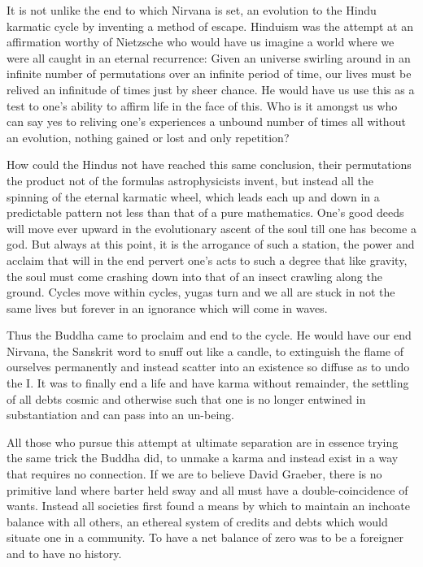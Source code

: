 \documentclass[ebook, 10pt, openright, onecolumn]{memoir}
\begin{document}
It is not unlike the end to which Nirvana is set, an evolution to the Hindu
karmatic cycle by inventing a method of escape.  Hinduism was the attempt at an
affirmation worthy of Nietzsche who would have us imagine a world where we were
all caught in an eternal recurrence: Given an universe swirling around in an
infinite number of permutations over an infinite period of time, our lives must
be relived an infinitude of times just by sheer chance.  He would have us use
this as a test to one's ability to affirm life in the face of this.  Who is it
amongst us who can say yes to reliving one's experiences a unbound number of
times all without an evolution, nothing gained or lost and only repetition?

How could the Hindus not have reached this same conclusion, their permutations
the product not of the formulas astrophysicists invent, but instead all the
spinning of the eternal karmatic wheel, which leads each up and down in a
predictable pattern not less than that of a pure mathematics.  One's good deeds
will move ever upward in the evolutionary ascent of the soul till one has become
a god.  But always at this point, it is the arrogance of such a station, the
power and acclaim that will in the end pervert one's acts to such a degree that
like gravity, the soul must come crashing down into that of an insect crawling
along the ground.  Cycles move within cycles, yugas turn and we all are stuck in
not the same lives but forever in an ignorance which will come in waves.

Thus the Buddha came to proclaim and end to the cycle.  He would have our end
Nirvana, the Sanskrit word to snuff out like a candle, to extinguish the flame
of ourselves permanently and instead scatter into an existence so diffuse as to
undo the I.  It was to finally end a life and have karma without remainder, the
settling of all debts cosmic and otherwise such that one is no longer entwined
in substantiation and can pass into an un-being.

All those who pursue this attempt at ultimate separation are in essence trying
the same trick the Buddha did, to unmake a karma and instead exist in a way that
requires no connection.  If we are to believe David Graeber, there is no
primitive land where barter held sway and all must have a double-coincidence of
wants.  Instead all societies first found a means by which to maintain an
inchoate balance with all others, an ethereal system of credits and debts which
would situate one in a community.  To have a net balance of zero was to be a
foreigner and to have no history.
\end{document}
